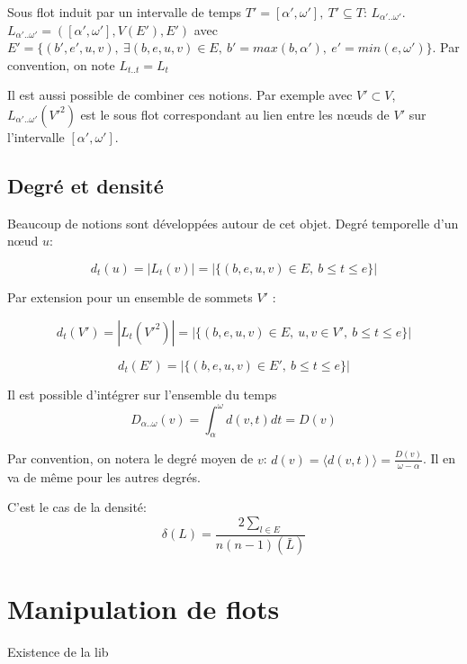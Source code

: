 Sous flot induit par un intervalle de temps $T'=[\alpha', \omega'],\ T' \subseteq T$: $L_{\alpha'..\omega'}$.
$L_{\alpha'..\omega'}=([\alpha', \omega'],V(E'),E')$ avec $E'= \{(b',e',u,v),\ \exists (b,e,u,v) \in E,\ b'= max(b,\alpha'),\ e'=min(e,\omega')\}$.
Par convention, on note $L_{t..t}=L_{t}$


Il est aussi possible de combiner ces notions.
Par exemple avec $V' \subset V$, $L_{\alpha'..\omega'}(V'^2)$ est le sous flot correspondant au lien entre les n\oe uds de $V'$ sur l'intervalle $[\alpha', \omega']$.


\subsection{Degré et densité}
Beaucoup de notions sont développées autour de cet objet.
Degré temporelle d'un n\oe ud $u$:

\begin{equation}
d_t(u)= |L_t(v)| = |\{(b,e,u,v) \in E,\ b \leq t \leq e\}|
\end{equation}

Par extension pour un ensemble de sommets $V'$ :

\begin{equation}
d_t(V')= |L_{t}(V'^2)| = |\{(b,e,u,v) \in E,\ u,v \in V',\ b \leq t \leq e\}|
\end{equation}


\begin{equation}
d_t(E')= |\{(b,e,u,v) \in E',\ b \leq t \leq e\}|
\end{equation}

Il est possible d'intégrer sur l'ensemble du temps 
\begin{equation}
D_{\alpha..\omega}(v)= \int_{\alpha}^{\omega}d(v,t) dt=D(v)
\end{equation}

Par convention, on notera le degré moyen de $v$: $d(v)= \langle d(v,t) \rangle=\frac{D(v)}{\omega-\alpha}$.
Il en va de même pour les autres degrés.

C'est le cas de la densité:
\begin{equation}
\delta(L)= \frac{2\sum_{l \in E}}{n(n-1)(\bar{L})}
\end{equation}



\section{Manipulation de flots}
Existence de la lib

